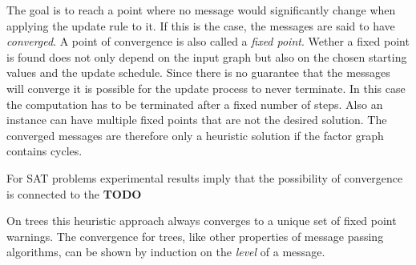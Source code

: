 The goal is to reach a point where no message would significantly change when applying the update rule to it. If this is the case, the messages are said to have \emph{converged}. A point of convergence is also called a \emph{fixed point}. Wether a fixed point is found  does not only depend on the input graph but also on the chosen starting values and the update schedule. Since there is no guarantee that the messages will converge it is possible for the update process to never terminate. In this case the computation has to be terminated after a fixed number of steps. Also an instance can have multiple fixed points that are not the desired solution. The converged messages are therefore only a heuristic solution if the factor graph contains cycles.

For SAT problems experimental results imply that the possibility of convergence is connected to the \textbf{TODO}

On trees this heuristic approach always converges to a unique set of fixed point warnings. The convergence for trees, like other properties of message passing algorithms, can be shown by induction on the \textit{level} of a message.

